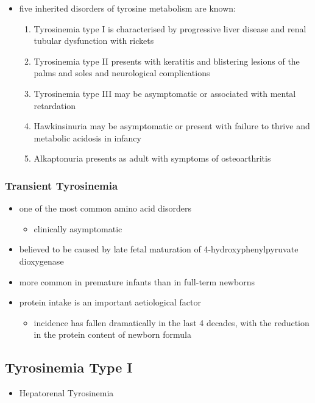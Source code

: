 \documentclass{scrartcl}
\begin{document}
\begin{itemize}
\item five inherited disorders of tyrosine metabolism are known:
\begin{enumerate}
\item Tyrosinemia type I is characterised by progressive
liver disease and renal tubular dysfunction with rickets
\item Tyrosinemia type II presents with keratitis and
blistering lesions of the palms and soles and neurological
complications
\item Tyrosinemia type III may be asymptomatic or associated with
mental retardation
\item Hawkinsinuria may be asymptomatic or present with failure to
thrive and metabolic acidosis in infancy
\item Alkaptonuria presents as adult with symptoms of osteoarthritis
\end{enumerate}
\end{itemize}

\subsubsection{Transient Tyrosinemia}
\label{sec:orgf5887fa}
\begin{itemize}
\item one of the most common amino acid disorders
\begin{itemize}
\item clinically asymptomatic
\end{itemize}
\item believed to be caused by late fetal maturation of
4-hydroxyphenylpyruvate dioxygenase
\item more common in premature infants than in full-term newborns
\item protein intake is an important aetiological factor
\begin{itemize}
\item incidence has fallen dramatically in the last 4 decades, with the
reduction in the protein content of newborn formula
\end{itemize}
\end{itemize}

\subsection{Tyrosinemia Type I}
\label{sec:org3f5ab91}
\begin{itemize}
\item Hepatorenal Tyrosinemia
\end{itemize}
\end{document}
